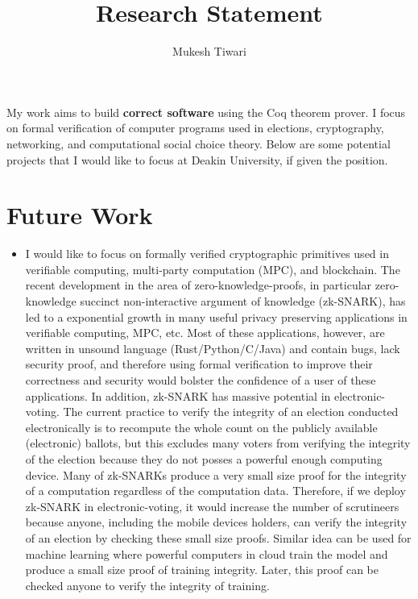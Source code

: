 \documentclass[a4paper]{article}
\title{Research Statement}
\author{Mukesh Tiwari}
\date{}
\begin{document}
\fontsize{11}{15}
\selectfont
\maketitle

My work aims to build \textbf{correct software} 
using the Coq theorem prover. 
I focus on formal verification of computer programs used in elections, cryptography, 
networking, and computational social choice theory. Below are some potential projects 
that I would like to focus at Deakin University, if given the position.


\section{Future Work}
\begin{itemize}
\item I would like to focus 
	on formally verified cryptographic primitives used in
	verifiable computing, multi-party computation (MPC), and blockchain.
	The recent development in the 
	area of zero-knowledge-proofs, in particular 
	zero-knowledge succinct non-interactive argument of knowledge (zk-SNARK), 
	has led to a exponential growth in many useful 
	privacy preserving applications in verifiable computing, MPC, etc. Most of these 
	applications, however, are written 
	in unsound language (Rust/Python/C/Java) and contain bugs,
	lack security proof, and therefore using formal verification 
	to improve their correctness and security would bolster the 
	confidence of a user of these applications.
	In addition, zk-SNARK has massive potential in electronic-voting. The current 
	practice to verify the integrity of an election conducted electronically is to 
	recompute the whole count on the publicly available (electronic) ballots, but 
	this excludes many voters from verifying the integrity of the election because 
	they do not posses a powerful enough computing device. Many of 
	zk-SNARKs produce a very small size proof for the integrity of a computation 
	regardless of the computation data. Therefore, if we deploy zk-SNARK in 
	electronic-voting, it would 
	increase the number of scrutineers because anyone, including the 
	mobile devices holders, can verify the integrity of an election 
	by checking these small size proofs. Similar idea can be 
	used for machine learning where powerful computers in cloud 
	train the model and produce a small size proof of training integrity. 
	Later, this proof can be checked anyone to verify the integrity of 
	training. 


\end{itemize}
\end{document}
